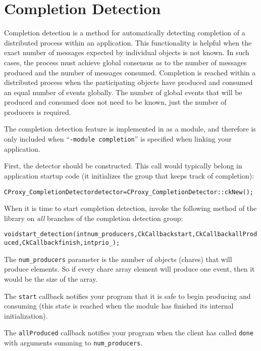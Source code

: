 \section{Completion Detection}

Completion detection is a method for automatically detecting completion of a
distributed process within an application. This functionality is helpful when
the exact number of messages expected by individual objects is not known. In
such cases, the process must achieve global consensus as to the number of
messages produced and the number of messages consumed.  Completion is reached
within a distributed process when the participating objects have produced and
consumed an equal number of events globally. The number of global events that
will be produced and consumed does not need to be known, just the number of
producers is required.


The completion detection feature is implemented in \charmpp{} as a
module, and therefore is only included when ``{\tt -module completion}'' is
specified when linking your application.

First, the detector should be constructed. This call would typically
belong in application startup code (it initializes the group that
keeps track of completion):

\begin{alltt}
CProxy_CompletionDetector detector = CProxy_CompletionDetector::ckNew();
\end{alltt}

When it is time to start completion detection, invoke the following method of the
library on {\em all} branches of the completion detection group:

\begin{alltt}
void start_detection(int num_producers, CkCallback start, CkCallback allProduced, CkCallback finish, int prio_);
\end{alltt}

The \verb|num_producers| parameter is the number of objects (chares)
that will produce elements. So if every chare array element will produce one
event, then it would be the size of the array.

The \verb|start| callback notifies your program that it is safe to
begin producing and consuming (this state is reached when the module
has finished its internal initialization).

The \verb|allProduced| callback notifies your program when the client has
called \verb|done| with arguments summing to \verb|num_producers|.

